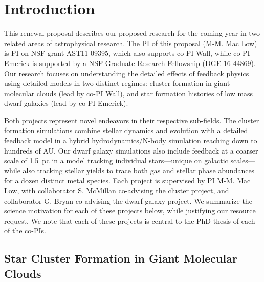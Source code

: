 \documentclass[11pt]{article}
\begin{document}
\maketitle

\section{Introduction}
This renewal proposal describes our proposed research for the coming year in two related areas of astrophysical research. The PI of this proposal (M-M. Mac Low) is PI on NSF grant AST11-09395, which also supports co-PI Wall, while co-PI Emerick is supported by a NSF Graduate Research Fellowship (DGE-16-44869).
Our research focuses on understanding the detailed effects of feedback physics 
using detailed models in two distinct regimes: cluster formation in giant molecular clouds (lead by co-PI Wall), and
star formation histories of low mass dwarf galaxies (lead by co-PI Emerick). 

Both projects represent novel endeavors in their respective sub-fields. The cluster formation simulations combine stellar dynamics and evolution with a detailed feedback model in a hybrid hydrodynamics/N-body simulation reaching down to hundreds of AU.  Our dwarf galaxy simulations also include feedback at a coarser scale of 1.5~pc in a model tracking individual stars---unique on galactic scales---while also tracking stellar yields to trace both gas and stellar phase abundances for a dozen distinct metal species. Each project is supervised by PI M-M. Mac Low, with collaborator S. McMillan co-advising the cluster project, and collaborator G. Bryan co-advising the dwarf galaxy project. We summarize the science motivation for each of these projects below, while justifying our resource request. We note that each of these projects is central to the PhD thesis of each of the co-PIs.

\subsection{Star Cluster Formation in Giant Molecular Clouds}
\end{document}
